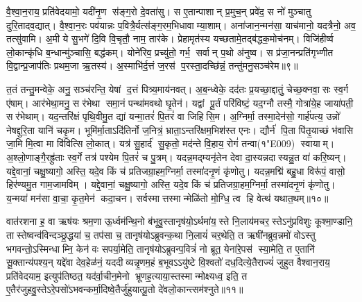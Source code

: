 वै॒श्वा॒न॒राय॒ प्रति॑वेदयामो॒ यदी॑नृ॒ण स॑ङ्ग॒रो दे॒वता॑सु। स ए॒तान्पाशान् प्र॒मुच॒न् प्रवे॑द॒ स नो॑ मुञ्चातु दुरि॒तादव॒द्यात्। वै॒श्वा॒न॒रः पव॑यान्नः प॒वित्रै॒र्यत्स॑ङ्ग॒रम॒भिधावाम्या॒शाम्। अना॑जान॒न्मन॑सा॒ याच॑मानो॒ यदत्रैनो॒ अव॒ तत्सु॑वामि। अ॒मी ये सु॒भगे॑ दि॒वि वि॒चृतौ॒ नाम॒ तार॑के। प्रेहामृत॑स्य यच्छतामे॒तद्ब॑द्धक॒मोच॑नम्। विजि॑हीर्ष्व लो॒कान्कृ॑धि ब॒न्धान्मु॑ञ्चासि॒ बद्ध॑कम्। योने॑रिव॒ प्रच्यु॑तो॒ गर्भ॒ सर्वान् प॒थो अ॑नुष्व। स प्र॑जा॒नन्प्रति॑गृभ्णीत वि॒द्वान्प्र॒जाप॑तिः प्रथम॒जा ऋ॒तस्य॑। अ॒स्माभि॑र्द॒त्तं ज॒रस॑ प॒रस्ता॒दच्छि॑न्नं॒ तन्तु॑मनु॒सञ्च॑रेम॥९॥

त॒तं तन्तु॒मन्वेके॒ अनु॒ सञ्च॑रन्ति॒ येषां द॒त्तं पित्र्य॒माय॑नवत्। अ॒ब॒न्ध्वेके॒ दद॑तः प्र॒यच्छा॒द्दातुं॒ चेच्छ॒क्नवा॒सः स्व॒र्ग ए॑षाम्। आर॑भेथा॒मनु॒ सर॑भेथा समा॒नं पन्था॑मवथो घृ॒तेन॑। यद्वां पू॒र्तं परि॑विष्टं॒ यद॒ग्नौ तस्मै॒ गोत्रा॑ये॒ह जाया॑पती॒ सर॑भेथाम्। यद॒न्तरि॑क्षं पृथि॒वीमु॒त द्यां यन्मा॒तरं॑ पि॒तरं॑ वा जिहिसि॒म। अ॒ग्निर्मा॒ तस्मा॒देन॑सो॒ गार्\mbox{}ह॑पत्य॒ उन्नो॑ नेषद्दुरि॒ता यानि॑ चकृ॒म। भूमि॑र्मा॒ताऽदि॑तिर्नो ज॒नित्रं॒ भ्राता॒ऽन्तरि॑क्षम॒भिश॑स्त एनः। द्यौर्न॑ पि॒ता पि॑तृ॒याच्छं भ॑वासि जा॒मि मि॒त्वा मा वि॑वित्सि लो॒कात्। यत्र॑ सु॒हार्द॑ सु॒कृतो॒ मद॑न्ते वि॒हाय॒ रोगं॑ तन्वा(१\char"E009) स्वायाम्। अ॒श्लो॒णाङ्गै॒रह्रु॑ताः स्व॒र्गे तत्र॑ पश्येम पि॒तरं॑ च पु॒त्रम्। यदन्न॒मद्म्यनृ॑तेन देवा दा॒स्यन्नदास्यन्नु॒त वा॑ करि॒ष्यन्। यद्दे॒वानां॒ चक्षु॒ष्यागो॒ अस्ति॒ यदे॒व किं च॑ प्रतिजग्रा॒हम॒ग्निर्मा॒ तस्मा॑दनृ॒णं कृ॑णोतु। यदन्न॒मद्मि॑ बहु॒धा विरू॑पं॒ वासो॒ हिर॑ण्यमु॒त गाम॒जामविम्। यद्दे॒वानां॒ चक्षु॒ष्यागो॒ अस्ति॒ यदे॒व किं च॑ प्रतिजग्रा॒हम॒ग्निर्मा॒ तस्मा॑दनृ॒णं कृ॑णोतु। य॒न्मया॑ मन॑सा वा॒चा॒ कृ॒त॒मेन॑ कदा॒चन। सर्वस्मात्तस्मान्मेळि॑तो मो॒ग्धि॒ त्व हि वेत्थ॑ यथात॒थम्॥१०॥\anuvakamend

वात॑रशना ह॒ वा ऋष॑यः श्रम॒णा ऊ॒र्ध्वम॑न्थि॒नो ब॑भूवु॒स्तानृष॑यो॒\-ऽर्थमा॑य॒स्ते नि॒लाय॑मचर॒स्तेऽनु॑प्रविशुः कूश्मा॒ण्डानि॒ तास्तेष्वन्व॑विन्दञ्छ्र॒द्धया॑ च॒ तप॑सा च॒ तानृष॑योऽब्रुवन्क॒था नि॒लायं॑ चर॒थेति॒ त ऋषी॑नब्रुव॒न्नमो॑ वोऽस्तु भगवन्तो॒ऽस्मिन्धाम्नि॒ केन॑ वः सपर्या॒मेति॒ तानृष॑योऽब्रुवन्प॒वित्रं॑ नो ब्रूत॒ येना॑रे॒पस॑ स्या॒मेति॒ त ए॒तानि॑ सू॒क्तान्य॑पश्य॒न् यद्दे॑वा देव॒हेळ॑नं॒ यददीव्यन्नृ॒णम॒हं ब॒भूवऽऽयु॑ष्टे वि॒श्वतो॑ दध॒दित्ये॒तैराज्यं॑ जुहुत वैश्वान॒राय॒ प्रति॑वेदयाम॒ इत्युप॑तिष्ठत॒ यद॑र्वा॒चीन॒मेनो भ्रूणह॒त्याया॒स्तस्मान्मोक्ष्यध्व॒ इति॒ त ए॒तैर॑जुहवु॒स्तेऽरे॒पसो॑\-ऽभवन्कर्मा॒दिष्वे॒तैर्जु॑हुयात्पू॒तो दे॑वलो॒कान्त्सम॑श्नुते॥११॥\anuvakamend


